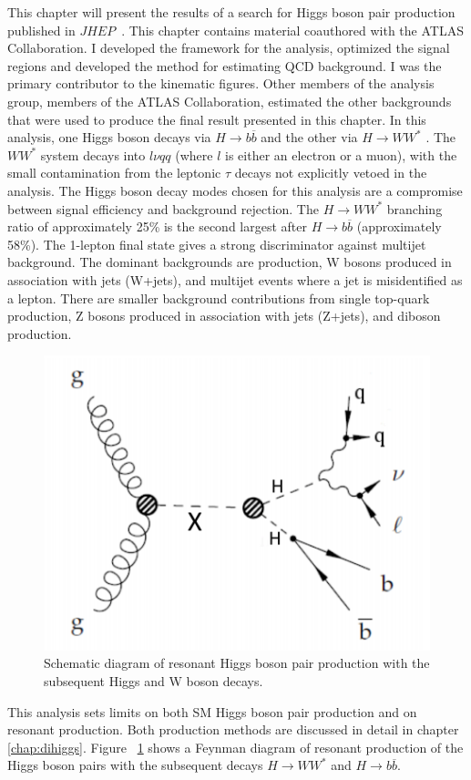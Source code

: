 This chapter will present the results of a search for Higgs boson pair production published in $JHEP$~\cite{Aaboud:2018zhh}. This chapter contains material coauthored with the ATLAS Collaboration. I developed the framework for the analysis, optimized the signal regions and developed the method for estimating QCD background. I was the primary contributor to the kinematic figures. Other members of the analysis group, members of the ATLAS Collaboration, estimated the other backgrounds that were used to produce the final result presented in this chapter. In this analysis, one Higgs boson decays via ${H\rightarrow b\overline{b}}$ and the other via ${H\rightarrow WW^{*}}$ . The ${WW^{*}}$ system decays into ${l\nu qq}$ (where ${l}$ is either an electron or a muon), with the small contamination from the leptonic ${\tau}$ decays not explicitly vetoed in the analysis. The Higgs boson decay modes chosen for this analysis are a compromise between signal efficiency and background rejection. The ${H\rightarrow WW^{*}}$ branching ratio of approximately 25\% is the second largest after ${H\rightarrow b\overline{b}}$ (approximately 58\%). The 1-lepton final state gives a strong discriminator against multijet background. The dominant backgrounds are \ttbar{} production, W bosons produced in association with jets (W+jets), and multijet events where a jet is misidentified as a lepton. There are smaller background  contributions from single top-quark production, Z bosons produced in association with jets (Z+jets), and diboson production.\newline

\begin{figure}[h]
\begin{center}
\includegraphics[scale=0.65]{figures/res_prod}
\caption[Schematic diagram of ${HH\rightarrow b\bar{b}WW^{*}\rightarrow b\bar{b}l\nu qq}$]{Schematic diagram of resonant Higgs boson pair production with the subsequent Higgs and W boson
decays.}
\label{fig:res}
\end{center}
\end{figure}

\indent This analysis sets limits on both SM Higgs boson pair production and on resonant production. Both production methods are discussed in detail in chapter \ref{chap:dihiggs}. Figure ~\ref{fig:res} shows a Feynman diagram of resonant production of the Higgs boson pairs with the subsequent decays ${H\rightarrow WW^{*}}$ and ${H\rightarrow b\overline{b}}$.

